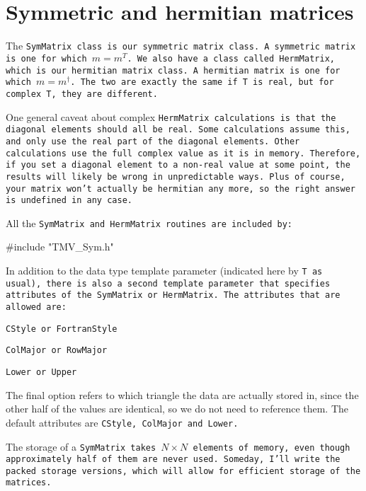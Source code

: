 
\section{Symmetric and hermitian matrices}
\label{SymMatrix}

The \tt{SymMatrix} class is our symmetric matrix class.  A symmetric matrix is
one for which $m = m^T$.  We also have a class called
\tt{HermMatrix}, which is our hermitian matrix class.  A hermitian matrix
is one for which $m = m^\dagger$.  The two are exactly the same 
if \tt{T} is real, but for complex \tt{T}, they are different.

One general caveat about complex \tt{HermMatrix} calculations is that the diagonal
elements should all be real.  Some calculations assume this, and only 
use the real part of the diagonal elements.  Other calculations use the 
full complex value as it is in memory.  Therefore, if you set a diagonal element 
to a non-real value at some point, the results will likely be wrong in
unpredictable ways.  Plus of course, your matrix won't actually be hermitian any more,
so the right answer is undefined in any case.

All the \tt{SymMatrix} and \tt{HermMatrix} routines are included by:
\begin{tmvcode}
#include "TMV_Sym.h"
\end{tmvcode}

In addition to the data type template parameter (indicated here by \tt{T} as usual),
there is also a second template parameter that specifies attributes of the
\tt{SymMatrix} or \tt{HermMatrix}.  The attributes that are allowed are:
\begin{description} \itemsep -2pt
\item[$\bullet$] \tt{CStyle} or \tt{FortranStyle}
\item[$\bullet$] \tt{ColMajor} or \tt{RowMajor}
\item[$\bullet$] \tt{Lower} or \tt{Upper}
\end{description}
The final option refers to which triangle the data are actually stored in, 
since the
other half of the values are identical, so we do not need to reference them.
The default attributes are \tt{CStyle}, \tt{ColMajor} and \tt{Lower}.

The storage of a \tt{SymMatrix} takes
$N \times N$ elements of memory, even though approximately half of them 
are never used.  Someday, I'll write the packed storage versions, which will allow for
efficient storage of the matrices.

